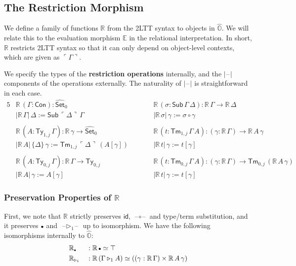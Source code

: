 \documentclass[acmsmall,screen]{acmart}
\newcommand{\msf}[1]{\mathsf{#1}}
\newcommand{\mbb}[1]{\mathbb{#1}}
\newcommand{\wh}[1]{\widehat{#1}}
\newcommand{\ext}{\triangleright}
\newcommand{\mbbo}{\mbb{O}}
\newcommand{\Con}{\msf{Con}}
\newcommand{\Sub}{\msf{Sub}}
\newcommand{\Ty}{\msf{Ty}}
\newcommand{\Tm}{\msf{Tm}}
\newcommand{\emptycon}{\scaleobj{.75}\bullet}
\newcommand{\id}{\msf{id}}
\newcommand{\Set}{\mathsf{Set}}
\newcommand{\blank}{{\mathord{\hspace{1pt}\text{--}\hspace{1pt}}}}
\newcommand{\emb}[1]{\ulcorner#1\urcorner}
\newcommand{\hato}{\bm\hat{\mbbo}}
\newcommand{\ev}{\mbb{E}}
\newcommand{\re}{\mbb{R}}
\theoremstyle{remark}
\newcommand{\whset}{\wh{\Set}}
\begin{document}
\subsection{The Restriction Morphism}

We define a family of functions $\re$ from the 2LTT syntax to objects in
$\hato$. We will relate this to the evaluation morphism $\ev$ in the relational
interpretation. In short, $\re$ restricts 2LTT syntax so that it can only depend
on object-level contexts, which are given as $\emb{\Gamma}$.

\begin{definition}\label{def:restriction} We specify the types of the \textbf{restriction operations} internally, and the $|\blank|$
components of the operations externally. The naturality of $|\blank|$ is
straightforward in each case.
\begingroup
\begin{alignat*}{5}
  & \re\,(\Gamma : \Con) : \whset_0 && \re\,(\sigma : \Sub\,\Gamma\,\Delta) : \re\,\Gamma \to \re\,\Delta \\
  & |\re\,\Gamma|\,\Delta := \Sub\,\emb{\Delta}\,\Gamma && |\re\,\sigma|\,\gamma := \sigma \circ \gamma \\
  & \\
  & \re\,(A : \Ty_{1,j}\,\Gamma) : \re\,\gamma \to \whset_0 && \re\,(t : \Tm_{1,j}\,\Gamma\,A) : (\gamma : \re\,\Gamma) \to \re\,A\,\gamma \\
  & |\re\,A|\,\{\Delta\}\,\gamma := \Tm_{1,j}\,\emb{\Delta}\,(A[\gamma])\hspace{2em} && |\re\,t|\,\gamma := t[\gamma]\\
  & \\
  & \re\,(A : \Ty_{0,j}\,\Gamma) : \re\,\Gamma \to \Ty_{0,j}\hspace{2em} && \re\,(t : \Tm_{0,j}\,\Gamma\,A) : (\gamma : \re\,\Gamma) \to \Tm_{0,j}\,(\re\,A\,\gamma)\\
  & |\re\,A|\,\gamma := A[\gamma] && |\re\,t|\,\gamma := t[\gamma]
\end{alignat*}
\endgroup
\end{definition}

\subsubsection{Preservation Properties of $\re$}
First, we note that $\re$ strictly preserves $\id$, $\blank\circ\blank$ and
type/term substitution, and it preserves $\emptycon$ and $\blank\ext_1\blank$ up
to isomorphism. We have the following isomorphisms internally to $\hato$:
\begin{alignat*}{3}
  & \re_{\emptycon} &&: \re\,\emptycon \simeq \top \\
  & \re_{\ext_1}   &&: \re\,(\Gamma \ext_1 A) \simeq ((\gamma : \re\,\Gamma) \times \re\,A\,\gamma)
\end{alignat*}
\end{document}
